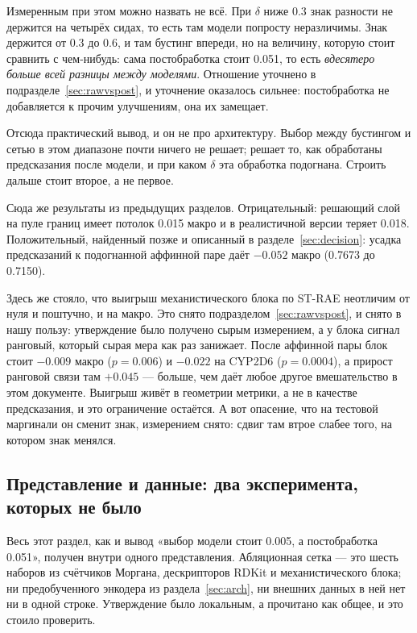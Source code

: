 Измеренным при этом можно назвать не всё. При $\delta$ ниже 0.3 знак разности не держится на
четырёх сидах, то есть там модели попросту неразличимы. Знак держится от 0.3 до 0.6, и там
бустинг впереди, но на величину, которую стоит сравнить с чем-нибудь: сама постобработка
стоит 0.051, то есть \emph{вдесятеро больше всей разницы между моделями}. Отношение
уточнено в подразделе~\ref{sec:rawvspost}, и уточнение оказалось сильнее: постобработка не
добавляется к прочим улучшениям, она их замещает.

Отсюда практический вывод, и он не про архитектуру. Выбор между бустингом и сетью в этом
диапазоне почти ничего не решает; решает то, как обработаны предсказания после модели, и
при каком $\delta$ эта обработка подогнана. Строить дальше стоит второе, а не первое.

Сюда же результаты из предыдущих разделов. Отрицательный: решающий слой на пуле границ имеет
потолок 0.015 макро и в реалистичной версии теряет 0.018. Положительный, найденный позже и
описанный в разделе~\ref{sec:decision}: усадка предсказаний к подогнанной аффинной паре даёт
$-0.052$ макро (0.7673 до 0.7150).

Здесь же стояло, что выигрыш механистического блока по ST-RAE неотличим от нуля и поштучно, и
на макро. Это снято подразделом~\ref{sec:rawvspost}, и снято в нашу пользу: утверждение было
получено сырым измерением, а у блока сигнал ранговый, который сырая мера как раз занижает.
После аффинной пары блок стоит $-0.009$ макро ($p = 0.006$) и $-0.022$ на CYP2D6
($p = 0.0004$), а прирост ранговой связи там $+0.045$ --- больше, чем даёт любое другое
вмешательство в этом документе. Выигрыш живёт в геометрии метрики,
а не в качестве предсказания, и это ограничение остаётся. А вот опасение, что на тестовой
маргинали он сменит знак, измерением снято: сдвиг там втрое слабее того, на котором знак
менялся.

\subsection{Представление и данные: два эксперимента, которых не было}

Весь этот раздел, как и вывод «выбор модели стоит 0.005, а постобработка 0.051», получен
внутри одного представления. Абляционная сетка --- это шесть наборов из счётчиков Моргана,
дескрипторов RDKit и механистического блока; ни предобученного энкодера из
раздела~\ref{sec:arch}, ни внешних данных в ней нет ни в одной строке. Утверждение было
локальным, а прочитано как общее, и это стоило проверить.

